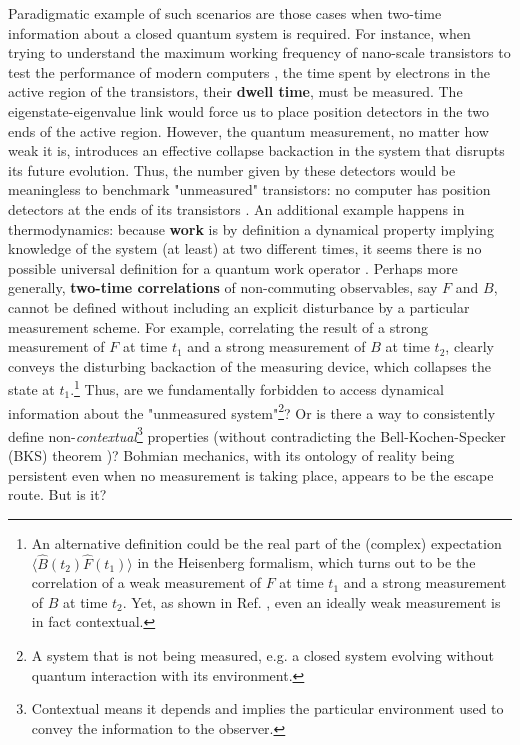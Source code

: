 \documentclass[11pt, a4paper]{article} %
\begin{document}
Paradigmatic example of such scenarios are those cases when two-time information about a closed quantum system is required. For instance, when trying to understand the maximum working frequency of nano-scale transistors to test the performance of modern computers \cite{modern}, the time spent by electrons in the active region of the transistors, their {\bf dwell time}, must be measured. The eigenstate-eigenvalue link would force us to place position detectors in the two ends of the active region. However, the quantum measurement, no matter how weak it is, introduces an effective collapse backaction in the system that disrupts its future evolution. Thus, the number given by these detectors would be meaningless to benchmark "unmeasured" transistors: no computer has position detectors at the ends of its transistors \cite{tunnel1, tunnel2}. An additional example happens in thermodynamics: because {\bf work} is by definition a dynamical property implying knowledge of the system (at least) at two different times, it seems there is no possible universal definition for a quantum work operator \cite{nogo, workPb1, workPb2}. Perhaps more generally, {\bf two-time correlations} of non-commuting observables, say $F$ and $B$, cannot be defined without including an explicit disturbance by a particular measurement scheme. For example, correlating the result of a strong measurement of $F$ at time $t_1$ and a strong measurement of $B$ at time $t_2$, clearly conveys the disturbing backaction of the measuring device, which collapses the state at $t_1$.\footnote{ An alternative definition could be the real part of the (complex) expectation $\langle \hat{B}(t_2)\hat{F}(t_1)\rangle$ in the Heisenberg formalism, which turns out to be the correlation of a weak measurement \cite{Weak} of $F$ at time $t_1$ and a strong measurement of $B$ at time $t_2$. Yet, as shown in Ref. \cite{DevInPosition2}, even an ideally weak measurement is in fact contextual.} Thus, are we fundamentally forbidden to access dynamical information about the "unmeasured system"\footnote{A system that is not being measured, e.g. a closed system evolving without quantum interaction with its environment.}? Or is there a way to consistently define non-{\em contextual}\footnote{Contextual means it depends and implies the particular environment used to convey the information to the observer.} properties (without contradicting the Bell-Kochen-Specker (BKS) theorem \cite{Mermin})? Bohmian mechanics, with its ontology of reality being persistent even when no measurement is taking place, appears to be the escape route. But is it?  \vspace{-0.15cm}
\end{document}
